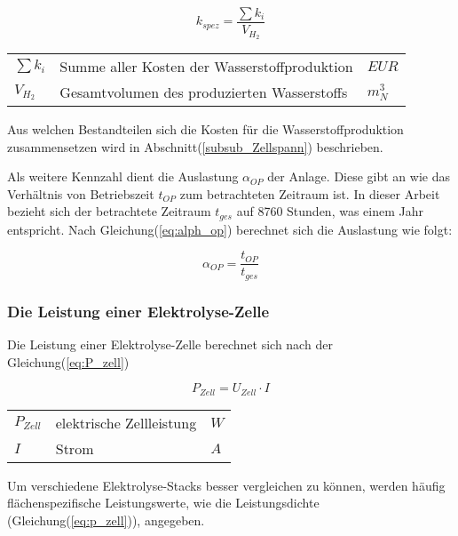 \documentclass[onecolumn,10pt,titlepage]{article}
\begin{document}
			\begin{equation}
			\label{eq:k_spez}
			k_{spez} = \frac{\sum{k_i}}{V_{H_2}}
			\end{equation}

			\begin{table}[H]
				\begin{tabular*}{\textwidth}{lll}
					$\sum{k_i}$&Summe aller Kosten der Wasserstoffproduktion&$EUR$\\
					$V_{H_2}$&Gesamtvolumen des produzierten Wasserstoffs&$m^3_N$\\
				\end{tabular*}
			\end{table}

			Aus welchen Bestandteilen sich die Kosten für die Wasserstoffproduktion zusammensetzen wird in Abschnitt(\ref{subsub_Zellspann}) beschrieben.

			Als weitere Kennzahl dient die Auslastung $\alpha_{OP}$ der Anlage. Diese gibt an wie das Verhältnis von Betriebszeit $t_{OP}$ zum betrachteten Zeitraum ist. In dieser Arbeit bezieht sich der betrachtete Zeitraum $t_{ges}$ auf 8760 Stunden, was einem Jahr entspricht. Nach Gleichung(\ref{eq:alph_op}) berechnet sich die Auslastung wie folgt:

			\begin{equation}
			\label{eq:alph_op}
			\alpha_{OP} = \frac{t_{OP}}{t_{ges}}
			\end{equation}

			\subsubsection*{Die Leistung einer Elektrolyse-Zelle}
			Die Leistung einer Elektrolyse-Zelle berechnet sich nach der Gleichung(\ref{eq:P_zell})

			\begin{equation}
			\label{eq:P_zell}
			P_{Zell} = U_{Zell}\cdot I
			\end{equation}

			\begin{table}[H]
				\begin{tabular*}{\textwidth}{lll}
					$P_{Zell}$&elektrische Zellleistung&$W$\\
					$I$&Strom&$A$\\
				\end{tabular*}
			\end{table}


			Um verschiedene Elektrolyse-Stacks besser vergleichen zu können, werden häufig flächenspezifische Leistungswerte, wie die Leistungsdichte (Gleichung(\ref{eq:p_zell})), angegeben.\cite{Klein.2013}
\end{document}
